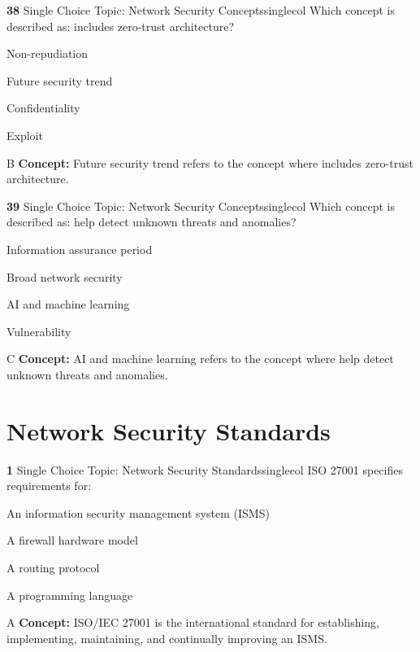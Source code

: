 \documentclass[10pt,a4paper]{article}
\begin{document}
\begin{qcard}{\color{white}\textbf{38} \hfill \small Single Choice \textbar{} Topic: Network Security Concepts}{singlecol}
Which concept is described as: includes zero-trust architecture?

\begin{qoptions}
\item Non-repudiation
\item Future security trend
\item Confidentiality
\item Exploit
\end{qoptions}
\begin{explainbox}{B}
\textbf{Concept:} Future security trend refers to the concept where includes zero-trust architecture.
\end{explainbox}
\end{qcard}

\begin{qcard}{\color{white}\textbf{39} \hfill \small Single Choice \textbar{} Topic: Network Security Concepts}{singlecol}
Which concept is described as: help detect unknown threats and anomalies?

\begin{qoptions}
\item Information assurance period
\item Broad network security
\item AI and machine learning
\item Vulnerability
\end{qoptions}
\begin{explainbox}{C}
\textbf{Concept:} AI and machine learning refers to the concept where help detect unknown threats and anomalies.
\end{explainbox}
\end{qcard}

\section{Network Security Standards}
\begin{qcard}{\color{white}\textbf{1} \hfill \small Single Choice \textbar{} Topic: Network Security Standards}{singlecol}
ISO 27001 specifies requirements for:

\begin{qoptions}
\item An information security management system (ISMS)
\item A firewall hardware model
\item A routing protocol
\item A programming language
\end{qoptions}
\begin{explainbox}{A}
\textbf{Concept:} ISO/IEC 27001 is the international standard for establishing, implementing, maintaining, and continually improving an ISMS.
\end{explainbox}
\end{qcard}
\end{document}
